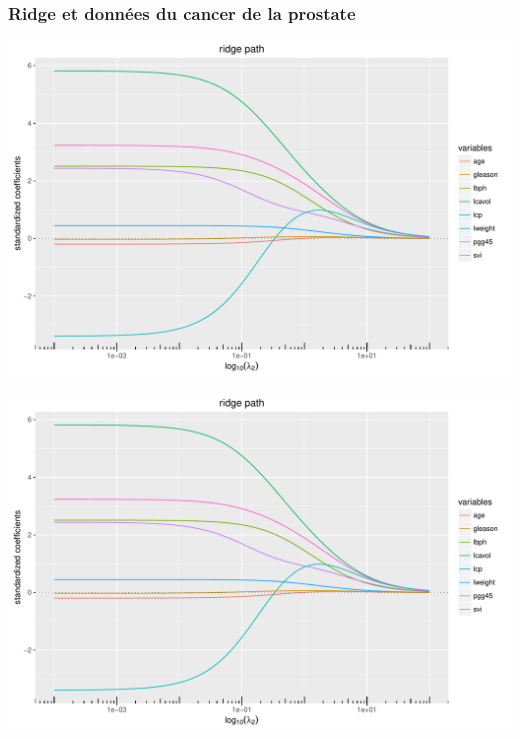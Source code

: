 \documentclass{beamer}\usepackage[]{graphicx}\usepackage[]{color}
\newenvironment{knitrout}{}{} %
\begin{document}
\begin{frame}[containsverbatim]
  \frametitle{Ridge et données du cancer de la prostate}
\begin{knitrout}\scriptsize
{}\color{fgcolor}
\includegraphics[width=\textwidth]{figures/toy_ridgeunnamed-chunk-50-1} 

\includegraphics[width=\textwidth]{figures/toy_ridgeunnamed-chunk-50-2} 

\end{knitrout}
\end{frame}
\end{document}
